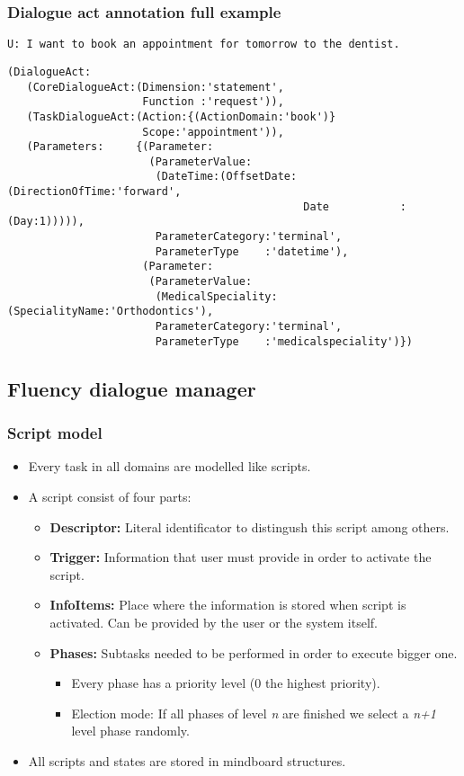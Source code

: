 \documentclass[11pt]{beamer}
\begin{document}
\begin{frame}[fragile]
\frametitle{Dialogue act annotation full example}
{\color{teal} 
	\texttt{U: I want to book an appointment for tomorrow to the dentist.}\\
}
\pause
\vspace{15pt}
\tiny
\begin{lstlisting}[language=lekta]
(DialogueAct:
   (CoreDialogueAct:(Dimension:'statement',
                     Function :'request')),
   (TaskDialogueAct:(Action:{(ActionDomain:'book')}
                     Scope:'appointment')),
   (Parameters:     {(Parameter:
                      (ParameterValue:
                       (DateTime:(OffsetDate:(DirectionOfTime:'forward',
                                              Date           :(Day:1))))),
                       ParameterCategory:'terminal',
                       ParameterType    :'datetime'),
                     (Parameter:
                      (ParameterValue:
                       (MedicalSpeciality:(SpecialityName:'Orthodontics'),
                       ParameterCategory:'terminal',
                       ParameterType    :'medicalspeciality')})
\end{lstlisting}
\end{frame}
				
\subsection{Fluency dialogue manager}

\begin{frame}
\frametitle{Script model}
\begin{itemize}
	\item Every task in all domains are modelled like scripts.
	\item A script consist of four parts:
	\begin{itemize}
	  \item \textbf{Descriptor:} Literal identificator to distingush this script among others.
		\item \textbf{Trigger:} Information that user must provide in order to activate the script.
		\item \textbf{InfoItems:} Place where the information is stored when script is activated. Can be provided by the user or the system itself.
		\item \textbf{Phases:} Subtasks needed to be performed in order to execute bigger one.
			\begin{itemize}
				\item Every phase has a priority level (0 the highest priority).
				\item Election mode: If all phases of level \emph{n} are finished we select a \emph{n+1} level phase randomly. 
			\end{itemize}
	\end{itemize}
	\item All scripts and states are stored in mindboard structures.
\end{itemize}
\end{frame}
\end{document}
